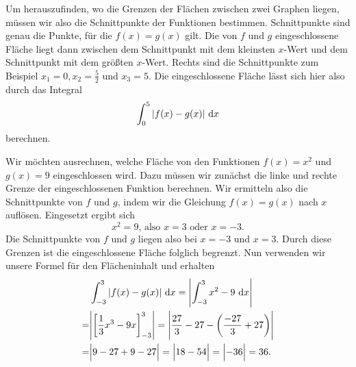 \documentclass[../../main.tex]{subfiles}
\begin{document}
Um herauszufinden, wo die Grenzen der Flächen zwischen zwei Graphen liegen, 
müssen wir also die Schnittpunkte der Funktionen bestimmen. Schnittpunkte sind genau die Punkte, für die $f(x)=g(x)$
gilt. Die von $f$ und $g$ eingeschlossene Fläche liegt dann zwischen dem Schnittpunkt mit dem kleinsten $x$-Wert und dem
Schnittpunkt mit dem größten $x$-Wert. Rechts sind die Schnittpunkte zum Beispiel $x_1=0, x_2=\frac{5}{2}$ und $x_3=5$.
Die eingeschlossene Fläche lässt sich hier also durch das Integral
\[\int_0^5|f(x)-g(x)|\mathop{}\mathrm{d} x\]
berechnen.
\begin{example}{}
    Wir möchten ausrechnen, welche Fläche von den Funktionen $f(x)=x^2$ und $g(x)=9$ eingeschlossen wird. Dazu müssen
    wir zunächst die linke und rechte Grenze der eingeschlossenen Funktion berechnen. Wir ermitteln also die Schnittpunkte
    von $f$ und $g$, indem wir die Gleichung $f(x)=g(x)$ nach $x$ auflösen. Eingesetzt ergibt sich
    \[x^2=9\text{, also }x=3\text{ oder }x=-3.\]
    Die Schnittpunkte von $f$ und $g$ liegen also bei $x=-3$ und $x=3$. Durch diese Grenzen ist die eingeschlossene
    Fläche folglich begrenzt. Nun verwenden wir unsere Formel für den Flächeninhalt und erhalten
    \begin{align*}
        &\int_{-3}^3|f(x)-g(x)|\mathop{}\mathrm{d} x=\Biggl|\int_{-3}^3x^2-9\mathop{}\mathrm{d} x\Biggr|\\
        =&\Biggl|\biggl[\frac{1}{3}x^3-9x\biggr]_{-3}^3\Biggr|=\Biggl|\frac{27}{3}-27-\biggl(\frac{-27}{3}+27\biggr)\Biggr|\\
        =&\Bigl|9-27+9-27\Bigr|=\Bigl|18-54\Bigr|=\Bigl|-36\Bigr|=36.
    \end{align*}
\end{example}{}
\end{document}
